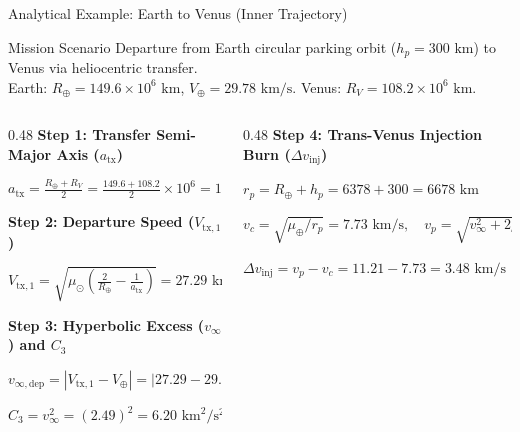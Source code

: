 \documentclass[aspectratio=169, 10pt]{beamer}
\begin{document}
\begin{frame}{Analytical Example: Earth to Venus (Inner Trajectory)}
    \begin{exampleblock}{Mission Scenario}
        \scriptsize
        Departure from Earth circular parking orbit ($h_p = 300\text{ km}$) to Venus via heliocentric transfer. \\
        Earth: $R_\oplus = 149.6 \times 10^6\text{ km}$, $V_\oplus = 29.78\text{ km/s}$. \quad Venus: $R_V = 108.2 \times 10^6\text{ km}$.
    \end{exampleblock}

    \vspace{-0.15cm}

    \begin{columns}[t]
        \begin{column}{0.48\textwidth}
            \scriptsize
            \textbf{Step 1: Transfer Semi-Major Axis ($a_{\text{tx}}$)}
            \par\vspace{1pt}
            $a_{\text{tx}} = \frac{R_\oplus + R_V}{2} = \frac{149.6 + 108.2}{2} \times 10^6 = \mathbf{128.9} \times 10^6\text{ km}$

            \vspace{0.06cm}
            \textbf{Step 2: Departure Speed ($V_{\text{tx},1}$)}
            \par\vspace{1pt}
            $V_{\text{tx},1} = \sqrt{\mu_\odot \left(\frac{2}{R_\oplus} - \frac{1}{a_{\text{tx}}}\right)} = \mathbf{27.29}\text{ km/s}$

            \vspace{0.06cm}
            \textbf{Step 3: Hyperbolic Excess ($v_\infty$) and $C_3$}
            \par\vspace{1pt}
            $v_{\infty,\text{dep}} = |V_{\text{tx},1} - V_\oplus| = |27.29 - 29.78| = \mathbf{2.49}\text{ km/s}$
            \par\vspace{1pt}
            $C_3 = v_\infty^2 = (2.49)^2 = \mathbf{6.20}\text{ km}^2/\text{s}^2$
        \end{column}

        \begin{column}{0.48\textwidth}
            \scriptsize
            \textbf{Step 4: Trans-Venus Injection Burn ($\Delta v_{\text{inj}}$)}
            \par\vspace{1pt}
            $r_p = R_\oplus + h_p = 6378 + 300 = 6678\text{ km}$
            \par\vspace{1pt}
            $v_c = \sqrt{\mu_\oplus / r_p} = 7.73\text{ km/s}, \quad v_p = \sqrt{v_\infty^2 + 2\mu_\oplus / r_p} = 11.21\text{ km/s}$
            \par\vspace{1pt}
            $\Delta v_{\text{inj}} = v_p - v_c = 11.21 - 7.73 = \mathbf{3.48}\text{ km/s}$


\end{column}
\end{columns}
\end{frame}
\end{document}
